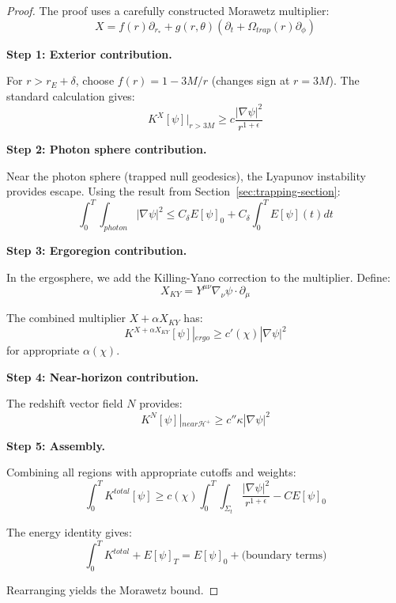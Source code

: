 \documentclass[12pt,a4paper]{article}
\begin{document}
\begin{proof}
The proof uses a carefully constructed Morawetz multiplier:
\begin{equation}
X = f(r)\partial_{r_*} + g(r, \theta)(\partial_t + \Omega_{trap}(r)\partial_\phi)
\end{equation}

\textbf{Step 1: Exterior contribution.}

For $r > r_E + \delta$, choose $f(r) = 1 - 3M/r$ (changes sign at $r = 3M$). The standard calculation gives:
\begin{equation}
K^X[\psi]|_{r > 3M} \geq c \frac{|\nabla \psi|^2}{r^{1+\epsilon}}
\end{equation}

\textbf{Step 2: Photon sphere contribution.}

Near the photon sphere (trapped null geodesics), the Lyapunov instability provides escape. Using the result from Section~\ref{sec:trapping-section}:
\begin{equation}
\int_0^T \int_{photon} |\nabla \psi|^2 \leq C_\delta E[\psi]_0 + C_\delta \int_0^T E[\psi](t) dt
\end{equation}

\textbf{Step 3: Ergoregion contribution.}

In the ergosphere, we add the Killing-Yano correction to the multiplier. Define:
\begin{equation}
X_{KY} = Y^{\mu\nu}\nabla_\nu \psi \cdot \partial_\mu
\end{equation}

The combined multiplier $X + \alpha X_{KY}$ has:
\begin{equation}
K^{X + \alpha X_{KY}}[\psi]|_{ergo} \geq c'(\chi) |\nabla \psi|^2
\end{equation}
for appropriate $\alpha(\chi)$.

\textbf{Step 4: Near-horizon contribution.}

The redshift vector field $N$ provides:
\begin{equation}
K^N[\psi]|_{near \mathcal{H}^+} \geq c''\kappa |\nabla \psi|^2
\end{equation}

\textbf{Step 5: Assembly.}

Combining all regions with appropriate cutoffs and weights:
\begin{equation}
\int_0^T K^{total}[\psi] \geq c(\chi) \int_0^T \int_{\Sigma_t} \frac{|\nabla \psi|^2}{r^{1+\epsilon}} - C E[\psi]_0
\end{equation}

The energy identity gives:
\begin{equation}
\int_0^T K^{total} + E[\psi]_T = E[\psi]_0 + \text{(boundary terms)}
\end{equation}

Rearranging yields the Morawetz bound.
\end{proof}
\end{document}
